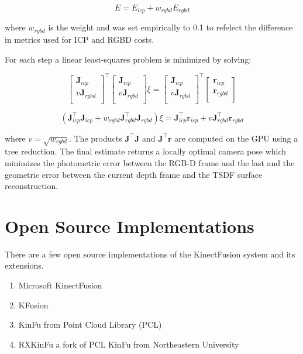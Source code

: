 \documentclass[10pt, twocolumn]{article}
\begin{document}
\begin{equation}
E = E_{icp} + w_{rgbd}E_{rgbd}
\end{equation}

where $w_{rgbd}$ is the weight and was set empirically to 0.1 to refelect the difference in metrics used for ICP and RGBD costs.

For each step a linear least-squares problem  is minimized by solving:

\begin{equation}
\begin{bmatrix}
       \mathbf{J}_{icp} \\[0.3em]
       v \mathbf{J}_{rgbd} \\[0.3em]
\end{bmatrix}^{\top}
\begin{bmatrix}
       \mathbf{J}_{icp} \\[0.3em]
       v \mathbf{J}_{rgbd} \\[0.3em]
\end{bmatrix}
\xi
=
\begin{bmatrix}
       \mathbf{J}_{icp} \\[0.3em]
       v \mathbf{J}_{rgbd} \\[0.3em]
\end{bmatrix}^{\top}
\begin{bmatrix}
       \mathbf{r}_{icp} \\[0.3em]
       \mathbf{r}_{rgbd} \\[0.3em]
\end{bmatrix}
\end{equation}

\begin{equation}
(\mathbf{J}^{\top}_{icp} \mathbf{J}_{icp} + w_{rgbd} \mathbf{J}^{\top}_{rgbd} \mathbf{J}_{rgbd}) \xi = \mathbf{J}^{\top}_{icp} \mathbf{r}_{icp} + v \mathbf{J}^{\top}_{rgbd} \mathbf{r}_{rgbd}
\end{equation}

where $v = \sqrt{w_{rgbd}}$. The products $\mathbf{J}^{\top}\mathbf{J}$ and $\mathbf{J}^{\top} \mathbf{r}$ are computed on the GPU using a tree reduction. The final estimate returns a locally optimal camera pose which minimizes the photometric error between the RGB-D frame and the last and the geometric error between the current depth frame and the TSDF surface reconstruction.


\section{Open Source Implementations} \label{sec:opensource}
There are a few open source implementations of the KinectFusion system and its extensions. 
\begin{enumerate}
  \item Microsoft KinectFusion \cite{MSKinectFusion}
  \item KFusion \cite{kfusion}
  \item KinFu from Point Cloud Library (PCL) \cite{kinfu}
  \item RXKinFu a fork of PCL KinFu from Northeastern University \cite{RXKinFu}
\end{enumerate}
\end{document}
